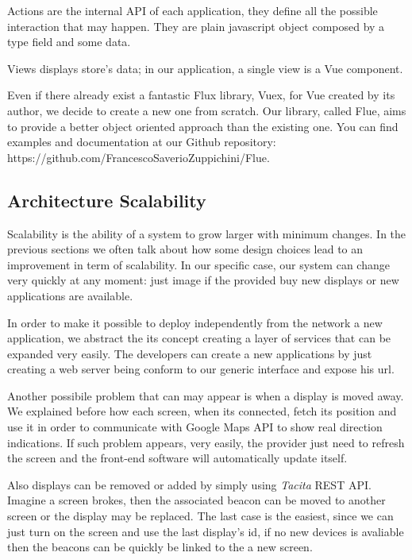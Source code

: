 \documentclass[]{usiinfbachelorproject}
\begin{document}
Actions are the internal API of each application, they define all the possible interaction that may happen. They are plain javascript object composed by a type field and some data.

Views displays store's data; in our application, a single view is a Vue component.

Even if there already exist a fantastic Flux library, Vuex, for Vue created by its author, we decide to create a new one from scratch. Our library, called Flue, aims to provide a better object oriented approach than the existing one. You can find examples and documentation at our Github repository: https://github.com/FrancescoSaverioZuppichini/Flue.

\begin{figure}[H]
  \centering
\end{figure} 
\subsection{Architecture Scalability}
Scalability is the ability of a system to grow larger with minimum changes. In the previous sections we often talk about how some design choices lead to an improvement in term of scalability. In our specific case, our system can change very quickly at any moment: just image if the provided buy new displays or new applications are available.

In order to make it possible to deploy independently from the network a new application, we abstract the its concept creating a layer of services that can be expanded very easily. The developers can create a new applications by just creating a web server being conform to our generic interface and expose his url.

Another possibile problem that can may appear is when a display is moved away. We explained before how each screen, when its connected, fetch its position and use it in order to communicate with Google Maps API to show real direction indications. If such problem appears, very easily, the provider just need to refresh the screen and the front-end software will automatically update itself.

Also displays can be removed or added by simply using \emph{Tacita} REST API. Imagine a screen brokes, then the associated beacon can be moved to another screen or the display may be replaced. The last case is the easiest, since we can just turn on the screen and use the last display's id, if no new devices is avaliable then the beacons can be quickly be linked to the a new screen.
\end{document}
